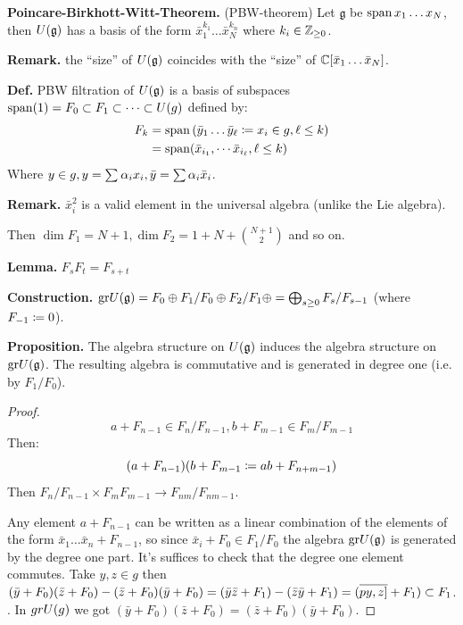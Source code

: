 \documentclass[]{../../../../tex/classes/styledArticle}
\newcommand\g  {\mathfrak{g}}
\begin{document}
	
	
	\textbf{Poincare-Birkhott-Witt-Theorem. }(PBW-theorem) Let $\g$ be $\operatorname{span} x_1 \dots x_N$, then $\UU(\g)$ has a basis of the form $\bar x^{k_1}_1 \dots \bar x_N^{k_n}$ where $k_i \in \mathbb{Z}_{\ge0}$. 
	
	\textbf{Remark. }the ``size'' of $\UU(\g)$ coincides with the ``size'' of $\mathbb{C}[\bar x_1 \dots \bar x_N]$. 
	
	\textbf{Def. }PBW filtration of $\UU(\g)$ is a basis of subspaces $\operatorname{span}(1) = F_0 \subset F_1 \subset \cdots \subset U(g)$ defined by: 
	\begin{align*}
		F_k &= \operatorname{span}\left ( \bar y_1 \dots \bar y_\ell \coloneqq x_i \in g, \ell \le k \right )  \\
		&= \operatorname{span}(\bar x_{i_1}, \cdots \bar x_{i_\ell}, \ell \le k)
	\end{align*}
	Where $y \in g, y = \sum_{}\alpha_i x_i, \bar y = \sum \alpha_i \bar x_i$. 
	
	\textbf{Remark.} $\bar x_i^{2}$ is a valid element in the universal algebra (unlike the Lie algebra). 
	
	Then $\dim F_1 = N + 1, \dim F_2 = 1 + N + \binom{N + 1}{2}$ and so on. 
	
	\textbf{Lemma. }$F_s F_t = F_{s + t}$
	
	\newcommand\gr {\mathrm{gr}}
	\textbf{Construction. }$\gr \UU(\g)= F_0 \oplus F_1/F_0 \oplus F_2/F_1 \oplus = \bigoplus_{s \ge 0}F_s/F_{s - 1}$ (where $F_{-1} \coloneqq 0$). 
	
	\textbf{Proposition. }The algebra structure on $\UU(\g)$ induces the algebra structure on $\gr \UU(\g)$. The resulting algebra is commutative and is generated in degree one (i.e. by $F_1/F_0$). \begin{proof}
		\[ a + F_{n - 1} \in F_n / F_{n - 1}, b + F_{m -1 } \in F_{m}/F_{m - 1} \]
		Then: 
		\[ (a + F_{n - 1})(b + F_{m - 1} \coloneqq ab + F_{n + m - 1}) \]
		Then $F_n/F_{n -1} \times F_{m}F_{m - 1} \to F_{nm}/F_{nm - 1}$. 
		
		Any element $a + F_{n - 1}$ can be written as a linear combination of the elements of the form $\bar x_1 \dots \bar x_n + F_{n - 1}$, so since $\bar x_i + F_0 \in F_1/F_0$ the algebra $\gr \UU(\g)$ is generated by the degree one part. 
		It's suffices to check that the degree one element commutes. Take $y, z \in g$ then $(\bar y + F_0)(\bar z + F_0) - (\bar z + F_0)(\bar y + F_0) = (\bar y \bar z + F_1) - (\bar z \bar y + F_1) = (\overline{py, z]} + F_1) \subset F_1$. . In $gr U(g) $ we got $(\bar y + F_0) (\bar z + F_0) = (\bar z + F_0)(\bar y + F_0)$. 
	\end{proof}
	
\end{document}

